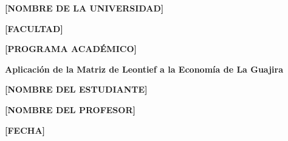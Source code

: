 \begin{titlepage}
    \centering
    \vspace*{2cm}


    \vspace{2cm}

    {\LARGE \textbf{[NOMBRE DE LA UNIVERSIDAD]} \par}

    \vspace{0.5cm}

    {\Large \textbf{[FACULTAD]} \par}

    \vspace{0.5cm}

    {\large \textbf{[PROGRAMA ACADÉMICO]} \par}

    \vspace{3cm}

    {\LARGE \textbf{Aplicación de la Matriz de Leontief a la Economía de La Guajira} \par}

    \vspace{3cm}

    {\large \textbf{[NOMBRE DEL ESTUDIANTE]} \par}

    \vspace{0.5cm}

    {\large \textbf{[NOMBRE DEL PROFESOR]} \par}

    \vspace{2cm}

    {\large \textbf{[FECHA]} \par}

    \vfill
\end{titlepage}
